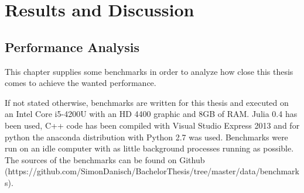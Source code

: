 \section{Results and Discussion}

\subsection{Performance Analysis}
This chapter supplies some benchmarks in order to analyze how close this thesis comes to achieve the wanted performance.

If not stated otherwise, benchmarks are written for this thesis and executed on an Intel Core i5-4200U with an HD 4400 graphic and 8GB of RAM.
Julia 0.4 has been used, C++ code has been compiled with Visual Studio Express 2013 and for python the anaconda distribution with Python 2.7 was used.
Benchmarks were run on an idle computer with as little background processes running as possible.
The sources of the benchmarks can be found on Github (https://github.com/SimonDanisch/BachelorThesis/tree/master/data/benchmarks).

